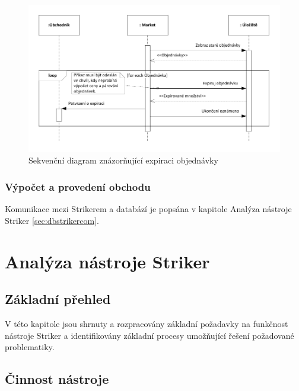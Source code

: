 \documentclass[thesis=M,czech]{FITthesis}[2012/06/26]
\begin{document}
\begin{figure}\centering
	\includegraphics[width=\textwidth]{images/seq-expire-order-anal} 
	\caption[Diagram expirace objednávky]{Sekvenční diagram znázorňující expiraci objednávky}\label{fig:seq-expire-order-anal}
\end{figure}


\subsection{Výpočet a provedení obchodu}

Komunikace mezi Strikerem a databází je popsána v kapitole Analýza nástroje Striker \ref{sec:dbstrikercom}. 


\chapter{Analýza nástroje Striker}


\section{Základní přehled}

V této kapitole jsou shrnuty a rozpracovány základní požadavky na funkčnost nástroje Striker
a identifikovány základní procesy umožňující řešení požadované problematiky.



\section{Činnost nástroje}
\end{document}
